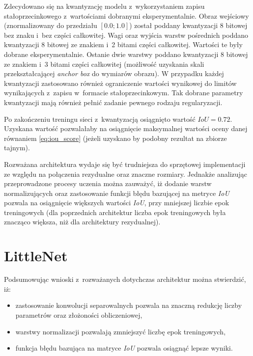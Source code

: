 Zdecydowano się na kwantyzację modelu z~wykorzystaniem zapisu stałoprzecinkowego z~wartościami dobranymi eksperymentalnie. 
Obraz wejściowy (znormalizowany do przedziału $[0.0;1.0]$) został poddany kwantyzacji 8 bitowej bez znaku i~bez części całkowitej. 
Wagi oraz wyjścia warstw pośrednich poddano kwantyzacji 8 bitowej ze znakiem i~2 bitami części całkowitej.
Wartości te były dobrane eksperymentalnie.
Ostanie dwie warstwy poddano kwantyzacji 8 bitowej ze znakiem i~3 bitami części całkowitej (możliwość uzyskania skali przekształcającej \emph{anchor box} do wymiarów obrazu).
W przypadku każdej kwantyzacji zastosowano również ograniczenie wartości wynikowej do limitów wynikających z~zapisu w~formacie stałoprzecinkowym. 
Tak dobrane parametry kwantyzacji mają również pełnić zadanie pewnego rodzaju regularyzacji.

Po zakończeniu treningu sieci z~kwantyzacją osiągnięto wartość $IoU = 0.72$.
Uzyskana wartość pozwalałaby na osiągnięcie maksymalnej wartości oceny 
danej równaniem \eqref{eq:iou_score} (jeżeli uzyskano by podobny rezultat na zbiorze tajnym).

Rozważana architektura wydaje się być trudniejsza do sprzętowej implementacji ze względu na połączenia rezydualne oraz znaczne rozmiary. 
Jednakże analizując przeprowadzone procesy uczenia można zauważyć, iż dodanie warstw normalizujących oraz zastosowanie funkcji błędu bazującej na metryce \emph{IoU} pozwala na osiągnięcie większych wartości \emph{IoU}, przy mniejszej liczbie epok treningowych 
(dla poprzednich architektur liczba epok treningowych była znacząco większa, niż dla architektury rezydualnej). 


\section{LittleNet}
\label{ch:LN}

Podsumowując wnioski z~rozważanych dotychczas architektur można stwierdzić, iż:
\begin{itemize}
    \item zastosowanie konwolucji separowalnych pozwala na znaczną redukcję liczby parametrów oraz złożoności obliczeniowej, 
    \item warstwy normalizacji pozwalają zmniejszyć liczbę epok treningowych,
    \item funkcja błędu bazująca na matryce \emph{IoU} pozwala osiągnąć lepsze wyniki.
\end{itemize}


